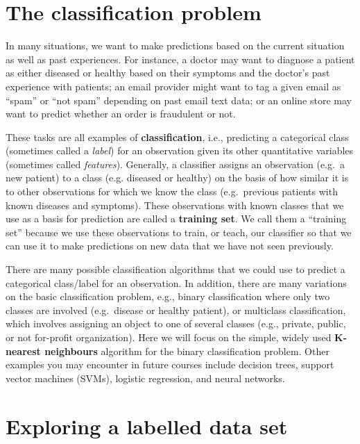 \documentclass[
]{krantz}
\begin{document}
\hypertarget{the-classification-problem}{%
\section{The classification problem}\label{the-classification-problem}}

In many situations, we want to make predictions based on the current situation
as well as past experiences. For instance, a doctor may want to diagnose a
patient as either diseased or healthy based on their symptoms and the doctor's
past experience with patients; an email provider might want to tag a given
email as ``spam'' or ``not spam'' depending on past email text data; or an online
store may want to predict whether an order is fraudulent or not.

These tasks are all examples of \textbf{classification}, i.e., predicting a
categorical class (sometimes called a \emph{label}) for an observation given its
other quantitative variables (sometimes called \emph{features}). Generally, a
classifier assigns an observation (e.g.~a new patient) to a class (e.g.
diseased or healthy) on the basis of how similar it is to other observations
for which we know the class (e.g.~previous patients with known diseases and
symptoms). These observations with known classes that we use as a basis for
prediction are called a \textbf{training set}. We call them a ``training set'' because
we use these observations to train, or teach, our classifier so that we can use
it to make predictions on new data that we have not seen previously.

There are many possible classification algorithms that we could use to predict
a categorical class/label for an observation. In addition, there are many
variations on the basic classification problem, e.g., binary classification
where only two classes are involved (e.g.~disease or healthy patient), or
multiclass classification, which involves assigning an object to one of several
classes (e.g., private, public, or not for-profit organization). Here we will
focus on the simple, widely used \textbf{K-nearest neighbours} algorithm for the
binary classification problem. Other examples you may encounter in future
courses include decision trees, support vector machines (SVMs), logistic
regression, and neural networks.

\hypertarget{exploring-a-labelled-data-set}{%
\section{Exploring a labelled data set}\label{exploring-a-labelled-data-set}}
\end{document}
